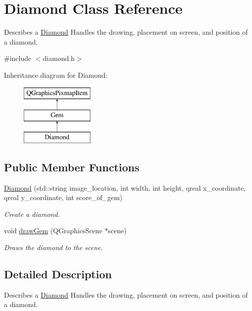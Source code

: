 \hypertarget{classDiamond}{\section{Diamond Class Reference}
\label{classDiamond}
}


Describes a \hyperlink{classDiamond}{Diamond} Handles the drawing, placement on screen, and position of a diamond.  




{\ttfamily \#include $<$diamond.\-h$>$}

Inheritance diagram for Diamond\-:\begin{figure}[H]
\begin{center}
\leavevmode
\includegraphics[height=3.000000cm]{classDiamond}
\end{center}
\end{figure}
\subsection*{Public Member Functions}
\begin{DoxyCompactItemize}
\item 
\hyperlink{classDiamond_af9b451f4382e3cbfba2bc34969e1ac3a}{Diamond} (std\-::string image\-\_\-location, int width, int height, qreal x\-\_\-coordinate, qreal y\-\_\-coordinate, int score\-\_\-of\-\_\-gem)
\begin{DoxyCompactList}\small\item\em Create a diamond. \end{DoxyCompactList}\item 
void \hyperlink{classDiamond_a7139292b0be9a93f99f48e6c00fac072}{draw\-Gem} (Q\-Graphics\-Scene $\ast$scene)
\begin{DoxyCompactList}\small\item\em Draws the diamond to the scene. \end{DoxyCompactList}\end{DoxyCompactItemize}


\subsection{Detailed Description}
Describes a \hyperlink{classDiamond}{Diamond} Handles the drawing, placement on screen, and position of a diamond. 

